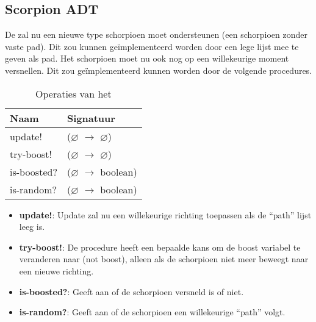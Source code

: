 \subsection{Scorpion ADT}
\label{section:scorpion}
De \texttt{} zal nu een nieuwe type schorpioen moet ondersteunen (een schorpioen zonder vaste pad).
Dit zou kunnen geïmplementeerd worden door een lege lijst mee te geven als pad.
Het schorpioen moet nu ook nog op een willekeurige moment versnellen.
Dit zou geïmplementeerd kunnen worden door de volgende procedures.

\begin{table}[hbt]
\centering
\begin{tabular}{|ll|}
\hline
\rowcolor[HTML]{000000} 
{\color[HTML]{FFFFFF} \textbf{Naam}} & {\color[HTML]{FFFFFF} \textbf{Signatuur}} \\ \hline
update!                                 & ($\varnothing$ $\rightarrow$ $\varnothing$)                                       \\ \hline
try-boost!                                 & ($\varnothing$ $\rightarrow$ $\varnothing$)                                       \\ \hline
is-boosted?  & ($\varnothing$ $\rightarrow$ boolean)                        \\ \hline
is-random?  & ($\varnothing$ $\rightarrow$ boolean)                        \\ \hline
\end{tabular}
\caption{Operaties van het \texttt{}}
\label{table:scorpion}
\end{table}

\begin{itemize}
	\item \textbf{update!}: Update zal nu een willekeurige richting toepassen als de ``path'' lijst leeg is.
	\item \textbf{try-boost!}: De procedure heeft een bepaalde kans om de boost variabel te veranderen naar (not boost),
		alleen als de schorpioen niet meer beweegt naar een nieuwe richting.
	\item \textbf{is-boosted?}: Geeft aan of de schorpioen versneld is of niet.
	\item \textbf{is-random?}: Geeft aan of de schorpioen een willekeurige ``path'' volgt.
\end{itemize}
